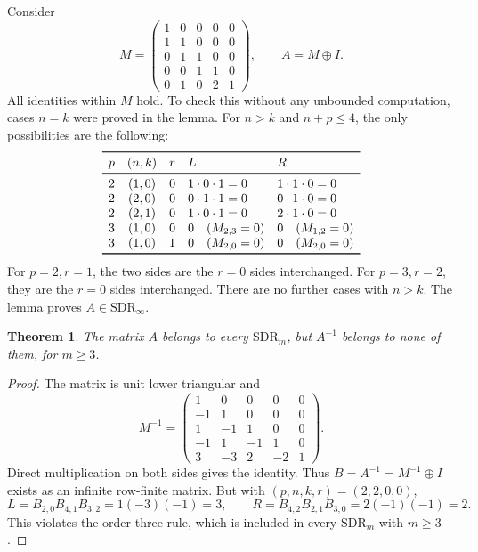 \documentclass[10pt]{article}
\newtheorem{theorem}{Theorem}
\newcommand{\SDR}{\mathrm{SDR}}
\begin{document}
Consider
\[
 M=\begin{pmatrix}
 1&0&0&0&0\\1&1&0&0&0\\0&1&1&0&0\\0&0&1&1&0\\0&1&0&2&1
 \end{pmatrix},\qquad A=M\oplus I.
\]
All identities within \(M\) hold. To check this without any unbounded
computation, cases \(n=k\) were proved in the lemma. For \(n>k\)
and \(n+p\le4\), the only possibilities are the following:
\[
\begin{array}{cccll}
\toprule
p&(n,k)&r&L&R\\
\midrule
2&(1,0)&0&1\cdot0\cdot1=0&1\cdot1\cdot0=0\\
2&(2,0)&0&0\cdot1\cdot1=0&0\cdot1\cdot0=0\\
2&(2,1)&0&1\cdot0\cdot1=0&2\cdot1\cdot0=0\\
3&(1,0)&0&0\quad(M_{2,3}=0)&0\quad(M_{1,2}=0)\\
3&(1,0)&1&0\quad(M_{2,0}=0)&0\quad(M_{2,0}=0)\\
\bottomrule
\end{array}
\]
For \(p=2,r=1\), the two sides are the \(r=0\) sides interchanged.
For \(p=3,r=2\), they are the \(r=0\) sides interchanged.
There are no further cases with \(n>k\). The lemma proves
\(A\in\SDR_\infty\).

\begin{theorem}
The matrix \(A\) belongs to every \(\SDR_m\), but \(A^{-1}\) belongs
to none of them, for \(m\ge3\).
\end{theorem}
\begin{proof}
The matrix is unit lower triangular and
\[
 M^{-1}=\begin{pmatrix}
 1&0&0&0&0\\-1&1&0&0&0\\1&-1&1&0&0\\-1&1&-1&1&0\\3&-3&2&-2&1
 \end{pmatrix}.
\]
Direct multiplication on both sides gives the identity.
Thus \(B=A^{-1}=M^{-1}\oplus I\) exists as an infinite row-finite
matrix. But with \((p,n,k,r)=(2,2,0,0)\),
\[
 L=B_{2,0}B_{4,1}B_{3,2}=1(-3)(-1)=3,
 \qquad
 R=B_{4,2}B_{2,1}B_{3,0}=2(-1)(-1)=2.
\]
This violates the order-three rule, which is included in every
\(\SDR_m\) with \(m\ge3\).
\end{proof}
\end{document}
